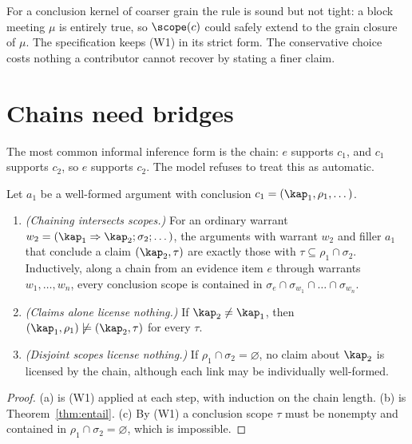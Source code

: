 For a conclusion kernel of coarser grain the rule is sound but not tight: a block meeting $\mu$ is entirely true, so $\scope(c)$ could safely extend to the grain closure of $\mu$. The specification keeps (W1) in its strict form. The conservative choice costs nothing a contributor cannot recover by stating a finer claim.

\section{Chains need bridges}

The most common informal inference form is the chain: $e$ supports $c_1$, and $c_1$ supports $c_2$, so $e$ supports $c_2$. The model refuses to treat this as automatic.

\begin{theorem}\label{thm:nowarrant}
Let $a_1$ be a well-formed argument with conclusion $c_1=(\kap_1,\rho_1,\dots)$.
\begin{enumerate}[label=(\alph*)]
\item \emph{(Chaining intersects scopes.)} For an ordinary warrant $w_2=(\kap_1\Rightarrow\kap_2;\sigma_2;\dots)$, the arguments with warrant $w_2$ and filler $a_1$ that conclude a claim $(\kap_2,\tau)$ are exactly those with $\tau\subseteq\rho_1\cap\sigma_2$. Inductively, along a chain from an evidence item $e$ through warrants $w_1,\dots,w_n$, every conclusion scope is contained in $\sigma_e\cap\sigma_{w_1}\cap\dots\cap\sigma_{w_n}$.
\item \emph{(Claims alone license nothing.)} If $\kap_2\ne\kap_1$, then $(\kap_1,\rho_1)\not\models(\kap_2,\tau)$ for every $\tau$.
\item \emph{(Disjoint scopes license nothing.)} If $\rho_1\cap\sigma_2=\varnothing$, no claim about $\kap_2$ is licensed by the chain, although each link may be individually well-formed.
\end{enumerate}
\end{theorem}

\begin{proof}
(a) is (W1) applied at each step, with induction on the chain length. (b) is Theorem~\ref{thm:entail}. (c) By (W1) a conclusion scope $\tau$ must be nonempty and contained in $\rho_1\cap\sigma_2=\varnothing$, which is impossible.
\end{proof}

